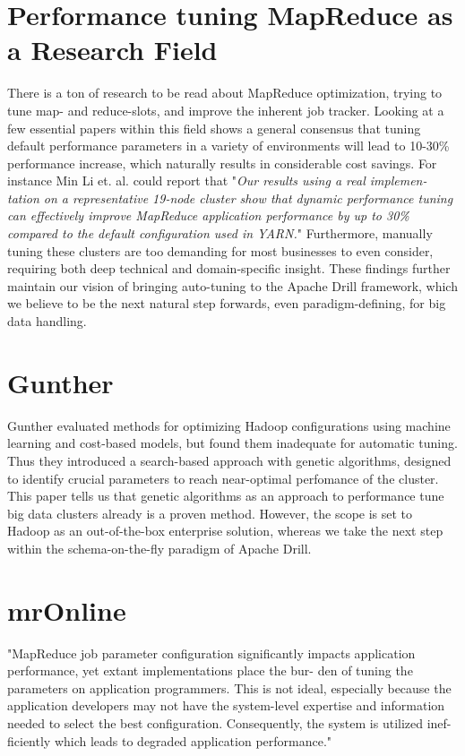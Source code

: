 \documentclass[a4paper,english]{report}
\begin{document}
		\section{Performance tuning MapReduce as a Research Field}
		There is a ton of research to be read about MapReduce optimization, trying to tune map- and reduce-slots, and improve the inherent job tracker. Looking at a few essential papers within this field shows a general consensus that tuning default performance parameters in a variety of environments will lead to 10-30\% performance increase, which naturally results in considerable cost savings. For instance Min Li et. al. could report that "\textit{Our results using a real implemen-
		tation on a representative 19-node cluster show that dynamic performance tuning can effectively improve MapReduce application performance by up to 30\% compared to the default configuration used in YARN.}"\cite{mronline} Furthermore, manually tuning these clusters are too demanding for most businesses to even consider, requiring both deep technical and domain-specific insight. These findings further maintain our vision of bringing auto-tuning to the Apache Drill framework, which we believe to be the next natural step forwards, even paradigm-defining, for big data handling.
		\section{Gunther}
		Gunther evaluated methods for optimizing Hadoop configurations using machine learning and cost-based models, but found them inadequate for automatic tuning. Thus they introduced a search-based approach with genetic algorithms, designed to identify crucial parameters to reach near-optimal perfomance of the cluster.\cite{gunther} This paper tells us that genetic algorithms as an approach to performance tune big data clusters already is a proven method. However, the scope is set to Hadoop as an out-of-the-box enterprise solution, whereas we take the next step within the schema-on-the-fly paradigm of Apache Drill.
		\section{mrOnline}
		"MapReduce job parameter configuration significantly impacts
		application performance, yet extant implementations place the bur-
		den of tuning the parameters on application programmers. This is
		not ideal, especially because the application developers may not
		have the system-level expertise and information needed to select
		the best configuration. Consequently, the system is utilized inef-
		ficiently which leads to degraded application performance."\cite{mronline}
\end{document}
